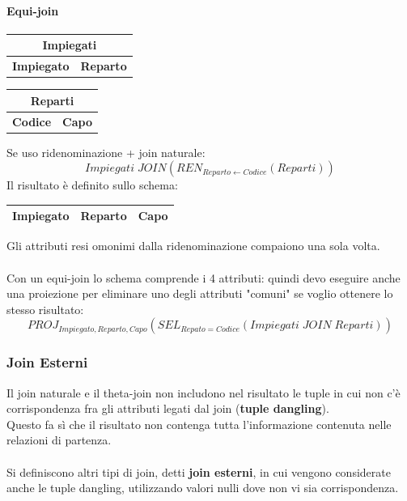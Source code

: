 \documentclass[../main.tex]{subfiles}
\begin{document}
	\paragraph{Equi-join}
	\begin{center}
		\begin{tabular}{ |c|c| }
			\hline
			\multicolumn{2}{|c|}{Impiegati}\\
			\hline
			\textbf{Impiegato} & \textbf{Reparto}\\
			\hline
		\end{tabular}
		\begin{tabular}{ |c|c| }
			\hline
			\multicolumn{2}{|c|}{Reparti}\\
			\hline
			\textbf{Codice} & \textbf{Capo}\\
			\hline
		\end{tabular}
	\end{center}
	Se uso ridenominazione + join naturale:
	\[Impiegati \; JOIN (REN_{Reparto \leftarrow Codice} (Reparti))\]
	Il risultato è definito sullo schema:
	\begin{center}
		\begin{tabular}{ |c|c|c| }
			\hline
			\textbf{Impiegato} & \textbf{Reparto} & \textbf{Capo}\\
			\hline
		\end{tabular}
	\end{center}
	Gli attributi resi omonimi dalla ridenominazione compaiono una sola volta.\\\\
	Con un equi-join lo schema comprende i 4 attributi: quindi devo eseguire anche una proiezione per eliminare uno degli attributi "comuni" se voglio ottenere lo stesso risultato:
	\[PROJ_{Impiegato, Reparto, Capo} (SEL_{Repato = Codice} (Impiegati \; JOIN \; Reparti))\]
	\subsubsection{Join Esterni}
	Il join naturale e il theta-join non includono nel risultato le tuple in cui non c’è corrispondenza fra gli attributi legati dal join (\textbf{tuple dangling}). \\
	Questo fa sì che il risultato non contenga tutta l’informazione contenuta nelle relazioni di partenza.\\\\
	Si definiscono altri tipi di join, detti \textbf{join esterni}, in cui vengono considerate anche le tuple dangling, utilizzando valori nulli dove non vi sia corrispondenza.
\end{document}
